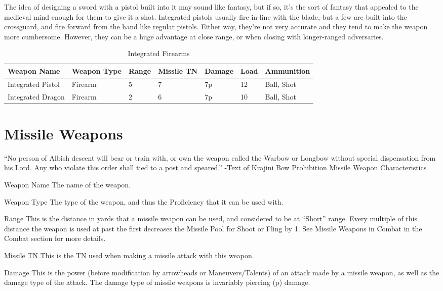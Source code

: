 \documentclass[oneside,11pt,english]{book}
\begin{document}
The idea of designing a sword with a pistol built into it may sound like fantasy, but if so, it’s the sort of fantasy that appealed to the medieval mind enough for them to give it a shot. Integrated pistols usually fire in-line with the blade, but a few are built into the crossguard, and fire forward from the hand like regular pistols. Either way, they’re not very accurate and they tend to make the weapon more cumbersome. However, they can be a huge advantage at close range, or when closing with longer-ranged adversaries.
\begin{table}[!ht]
	\caption{Integrated Firearms}
	\label{tab:Integrated Firearms}
	\begin{tabu} to 
Weapon Name &Weapon Type &Range &Missile TN &Damage &Load &Ammunition\\\toprule
Integrated Pistol &Firearm &5 &7 &7p &12 &Ball, Shot\\
Integrated Dragon &Firearm &2 &6 &7p &10 &Ball, Shot\\
	\end{tabu}
\end{table}

\chapter{Missile Weapons}
“No person of Albish descent will bear or train with, or own the weapon called the Warbow or Longbow 
without special dispensation from his Lord. Any who violate this order shall tied to a post and speared.” 
-Text of Krajini Bow Prohibition 
Missile Weapon Characteristics 


Weapon Name 
The name of the weapon.

Weapon Type 
The type of the weapon, and thus the Proficiency that it can be used with. 

 

Range 
This is the distance in yards that a missile weapon can be used, and considered to be at “Short” range. 
Every multiple of this distance the weapon is used at past the first decreases the Missile Pool for Shoot or 
Fling by 1. See Missile Weapons in Combat in the Combat section for more details. 


 

Missile TN 
This is the TN used when making a missile attack with this weapon. 

 

Damage 
This is the power (before modification by arrowheads or Maneuvers/Talents) of an attack made by a 
missile weapon, as well as the damage type of the attack. The damage type of missile weapons is 
invariably piercing (p) damage. 
\end{document}
